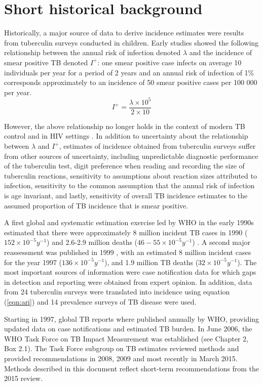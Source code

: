\section{Short historical background}

Historically, a major source of data to derive incidence estimates were results from tuberculin surveys conducted in children\cite{Styblo1985}. Early studies showed  the following relationship between the annual risk of infection denoted $\lambda$ and the incidence of smear positive TB denoted $I^+$: one smear positive case infects on average 10 individuals per year for a period of 2 years and an annual risk of infection of 1\% corresponds approximately to an incidence of 50 smear positive cases per 100 000 per year.
\begin{equation}
\label{eqn:ari}
I^+ = \frac{\lambda \times 10^5}{2 \times 10}
\end{equation}

However, the above relationship no longer holds in the context of modern TB control and in HIV settings \cite{18235886}. In addition to uncertainty about the relationship between $\lambda$ and $I^+$, estimates of incidence obtained from tuberculin surveys suffer from other sources of uncertainty, including unpredictable diagnostic performance of the tuberculin test, digit preference when reading and recording the size of tuberculin reactions, sensitivity to assumptions about reaction sizes attributed to infection, sensitivity to the common assumption that the annual risk of infection is age invariant, and lastly, sensitivity of overall TB incidence estimates to the assumed proportion of TB incidence that is smear positive. 

A first global and systematic estimation exercise led by WHO in the early 1990s estimated that there were approximately 8 million incident TB cases in 1990 ($152 \times 10^{-5} y^{-1}$) and 2.6-2.9 million deaths ($46-55 \times 10^{-5} y^{-1}$) \cite{1600578}. A second major reassessment was published in 1999 \cite{10517722}, with an estimated 8 million incident  cases for the year 1997 ($136 \times 10^{-5} y^{-1}$), and 1.9 million TB deaths ($32 \times 10^{-5} y^{-1}$). The most important sources of information were case notification data for which gaps in detection and reporting were obtained from expert opinion. In addition, data from 24 tuberculin surveys were translated into incidence using equation (\ref{eqn:ari}) and 14 prevalence surveys of TB disease were used.

Starting in 1997, global TB reports where published annually by WHO, providing updated data on case notifications and estimated TB burden. In June 2006, the WHO Task Force on TB Impact Measurement was established \cite{18201929} (see Chapter 2, Box 2.1). The Task Force subgroup on TB estimates reviewed methods and provided recommendations in 2008, 2009 and most recently in March 2015. Methods described in this document reflect short-term recommendations from the 2015 review. 




  
  
  
  
  
  
  
  
  
  
  
